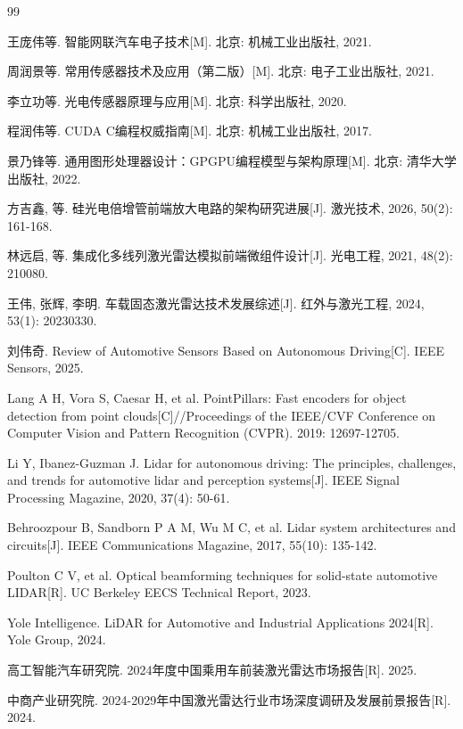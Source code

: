 \documentclass[12pt,a4paper,openany,UTF8]{ctexbook}
\begin{document}
\begin{thebibliography}{99}

 王庞伟等. 智能网联汽车电子技术[M]. 北京: 机械工业出版社, 2021.

 周润景等. 常用传感器技术及应用（第二版）[M]. 北京: 电子工业出版社, 2021.

 李立功等. 光电传感器原理与应用[M]. 北京: 科学出版社, 2020.

 程润伟等. CUDA C编程权威指南[M]. 北京: 机械工业出版社, 2017.

 景乃锋等. 通用图形处理器设计：GPGPU编程模型与架构原理[M]. 北京: 清华大学出版社, 2022.

 方吉鑫, 等. 硅光电倍增管前端放大电路的架构研究进展[J]. 激光技术, 2026, 50(2): 161-168.

 林远启, 等. 集成化多线列激光雷达模拟前端微组件设计[J]. 光电工程, 2021, 48(2): 210080.

 王伟, 张辉, 李明. 车载固态激光雷达技术发展综述[J]. 红外与激光工程, 2024, 53(1): 20230330.

 刘伟奇. Review of Automotive Sensors Based on Autonomous Driving[C]. IEEE Sensors, 2025.

 Lang A H, Vora S, Caesar H, et al. PointPillars: Fast encoders for object detection from point clouds[C]//Proceedings of the IEEE/CVF Conference on Computer Vision and Pattern Recognition (CVPR). 2019: 12697-12705.

 Li Y, Ibanez-Guzman J. Lidar for autonomous driving: The principles, challenges, and trends for automotive lidar and perception systems[J]. IEEE Signal Processing Magazine, 2020, 37(4): 50-61.

 Behroozpour B, Sandborn P A M, Wu M C, et al. Lidar system architectures and circuits[J]. IEEE Communications Magazine, 2017, 55(10): 135-142.

 Poulton C V, et al. Optical beamforming techniques for solid-state automotive LIDAR[R]. UC Berkeley EECS Technical Report, 2023.

 Yole Intelligence. LiDAR for Automotive and Industrial Applications 2024[R]. Yole Group, 2024.

 高工智能汽车研究院. 2024年度中国乘用车前装激光雷达市场报告[R]. 2025.

 中商产业研究院. 2024-2029年中国激光雷达行业市场深度调研及发展前景报告[R]. 2024.


\end{thebibliography}
\end{document}
